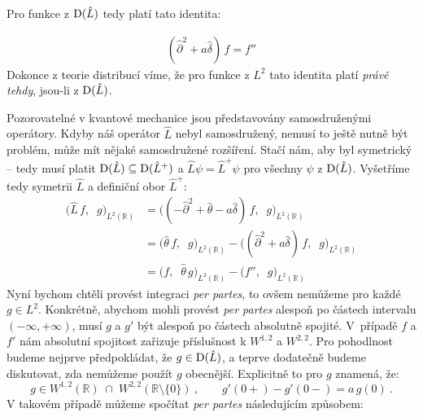 \documentclass{article}
\newcommand{\R}{\mathbb{R}}
\begin{document}
Pro funkce z ${\rm D}(\hat L)$ tedy platí tato identita:
\begin{samepage}
\begin{align*}
    (\hat\partial^2 + a\hat\delta) \, f = f''
\end{align*}
Dokonce z teorie distribucí víme, že pro funkce z $L^2$ tato identita platí \textit{právě tehdy}, jsou-li z ${\rm D}(\hat L)$.
\end{samepage}

Pozorovatelné v kvantové mechanice jsou představovány samosdruženými operátory. Kdyby náš operátor $\hat L$ nebyl samosdružený, nemusí to ještě nutně být problém, může mít nějaké samosdružené rozšíření. Stačí nám, aby byl symetrický – tedy musí platit ${\rm D}(\hat L) \subseteq {\rm D}(\hat L^+)$ a $\hat L \psi = \hat L^+ \psi$ pro všechny $\psi$ z ${\rm D}(\hat L)$. Vyšetříme tedy symetrii $\hat L$ a definiční obor $\hat L^+$:
\begin{align*}
    \big( \hat L \, f, \;\; g \big)_{L^2(\R)}
    &= \big( (-\hat\partial^2 + \hat\theta - a\hat\delta) \, f, \;\; g \big)_{L^2(\R)} \\[5pt]
    &= \big( \hat\theta \, f, \;\; g \big)_{L^2(\R)}
    - \big( (\hat\partial^2 + a\hat\delta) \, f, \;\; g \big)_{L^2(\R)} \\[5pt]
    &= \big( f, \;\; \hat\theta \, g \big)_{L^2(\R)}
    - \big( f'' \!, \;\; g \big)_{L^2(\R)}
\end{align*}
Nyní bychom chtěli provést integraci \textit{per partes}, to ovšem nemůžeme pro každé $g\in L^2$. Konkrétně, abychom mohli provést \textit{per partes} alespoň po částech intervalu $(-\infty, +\infty)$, musí $g$ a $g'$ být alespoň po částech absolutně spojité. V~případě $f$ a $f'$ nám absolutní spojitost zařizuje příslušnost k $W^{1,2}$ a $W^{2,2}$. Pro pohodlnost budeme nejprve předpokládat, že $g \in {\rm D}(\hat L)$, a teprve dodatečně budeme diskutovat, zda nemůžeme použít $g$ obecnější. Explicitně to pro $g$ znamená, že:
\begin{equation*}
    g \in W^{1,2}(\R) \;\cap\; W^{2,2}(\R \setminus \{0\})
    \: , \qquad
    g'(0+) - g'(0-) = a \, g(0)
    \: .
\end{equation*}
V takovém případě můžeme spočítat \textit{per partes} následujícím způsobem:
\end{document}
